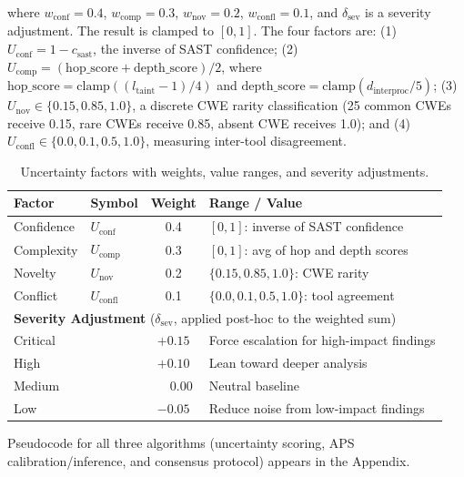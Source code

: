 \noindent where $w_{\text{conf}} = 0.4$, $w_{\text{comp}} = 0.3$, $w_{\text{nov}} = 0.2$, $w_{\text{confl}} = 0.1$, and $\delta_{\text{sev}}$ is a severity adjustment. The result is clamped to $[0, 1]$. The four factors are: (1)~$U_{\text{conf}} = 1 - c_{\text{sast}}$, the inverse of SAST confidence; (2)~$U_{\text{comp}} = (\text{hop\_score} + \text{depth\_score})/2$, where $\text{hop\_score} = \text{clamp}((l_{\text{taint}} - 1)/4)$ and $\text{depth\_score} = \text{clamp}(d_{\text{interproc}}/5)$; (3)~$U_{\text{nov}} \in \{0.15, 0.85, 1.0\}$, a discrete CWE rarity classification (25 common CWEs receive 0.15, rare CWEs receive 0.85, absent CWE receives 1.0); and (4)~$U_{\text{confl}} \in \{0.0, 0.1, 0.5, 1.0\}$, measuring inter-tool disagreement.

\begin{table}[H]
\centering
\small
\caption{Uncertainty factors with weights, value ranges, and severity adjustments.}
\label{tab:uncertainty-factors}
\begin{tabular}{llcl}
\toprule
\textbf{Factor} & \textbf{Symbol} & \textbf{Weight} & \textbf{Range / Value} \\
\midrule
Confidence  & $U_{\text{conf}}$  & 0.4 & $[0, 1]$: inverse of SAST confidence \\
Complexity  & $U_{\text{comp}}$  & 0.3 & $[0, 1]$: avg of hop and depth scores \\
Novelty     & $U_{\text{nov}}$   & 0.2 & $\{0.15, 0.85, 1.0\}$: CWE rarity \\
Conflict    & $U_{\text{confl}}$ & 0.1 & $\{0.0, 0.1, 0.5, 1.0\}$: tool agreement \\
\midrule
\multicolumn{4}{l}{\textbf{Severity Adjustment} ($\delta_{\text{sev}}$, applied post-hoc to the weighted sum)} \\
\midrule
\multicolumn{2}{l}{Critical} & $+0.15$ & Force escalation for high-impact findings \\
\multicolumn{2}{l}{High}     & $+0.10$ & Lean toward deeper analysis \\
\multicolumn{2}{l}{Medium}   & $\phantom{+}0.00$ & Neutral baseline \\
\multicolumn{2}{l}{Low}      & $-0.05$ & Reduce noise from low-impact findings \\
\bottomrule
\end{tabular}
\end{table}

Pseudocode for all three algorithms (uncertainty scoring, APS calibration/inference, and consensus protocol) appears in the Appendix.


